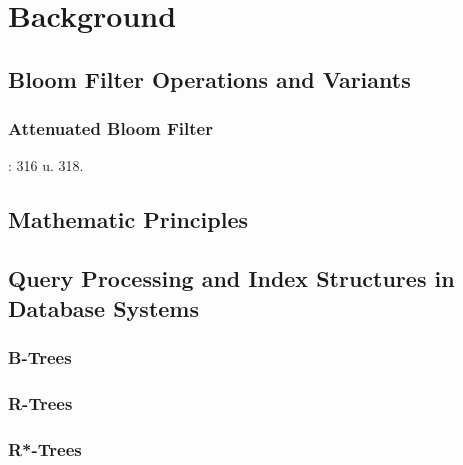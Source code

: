 \chapter{Background}\label{sec:Background}
\section{Bloom Filter Operations and Variants}
\subsection{Attenuated Bloom Filter}
\cite{Sakuma2011}: 316 u. 318.
\section{Mathematic Principles}
\section{Query Processing and Index Structures in Database Systems}
\cite{Ottmann2012}
\subsection{B-Trees}	
\cite{Knuth1998}	
\subsection{R-Trees}
\subsection{R*-Trees}
